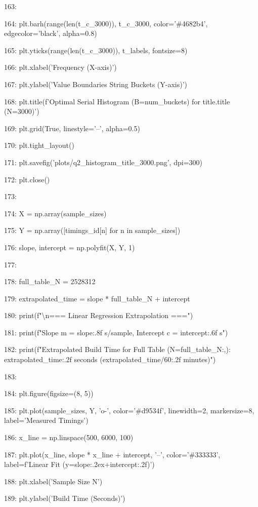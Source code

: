 \documentclass[11pt,a4paper]{article}
\begin{document}
163:

164:     plt.barh(range(len(t\_c\_3000)), t\_c\_3000, color='\#4682b4', edgecolor='black', alpha=0.8)

165:     plt.yticks(range(len(t\_c\_3000)), t\_labels, fontsize=8)

166:     plt.xlabel('Frequency (X-axis)')

167:     plt.ylabel('Value Boundaries String Buckets (Y-axis)')

168:     plt.title(f'Optimal Serial Histogram (B={num\_buckets}) for title.title (N=3000)')

169:     plt.grid(True, linestyle='--', alpha=0.5)

170:     plt.tight\_layout()

171:     plt.savefig('plots/q2\_histogram\_title\_3000.png', dpi=300)

172:     plt.close()

173:

174:     X = np.array(sample\_sizes)

175:     Y = np.array([timings\_id[n] for n in sample\_sizes])

176:     slope, intercept = np.polyfit(X, Y, 1)

177:

178:     full\_table\_N = 2528312

179:     extrapolated\_time = slope * full\_table\_N + intercept

180:     print(f"\textbackslash{}n=== Linear Regression Extrapolation ===")

181:     print(f"Slope m = {slope:.8f} s/sample, Intercept c = {intercept:.6f} s")

182:     print(f"Extrapolated Build Time for Full Table (N={full\_table\_N:,}): {extrapolated\_time:.2f} seconds ({extrapolated\_time/60:.2f} minutes)")

183:

184:     plt.figure(figsize=(8, 5))

185:     plt.plot(sample\_sizes, Y, 'o-', color='\#d9534f', linewidth=2, markersize=8, label='Measured Timings')

186:     x\_line = np.linspace(500, 6000, 100)

187:     plt.plot(x\_line, slope * x\_line + intercept, '--', color='\#333333', label=f'Linear Fit (y={slope:.2e}x+{intercept:.2f})')

188:     plt.xlabel('Sample Size N')

189:     plt.ylabel('Build Time (Seconds)')
\end{document}
